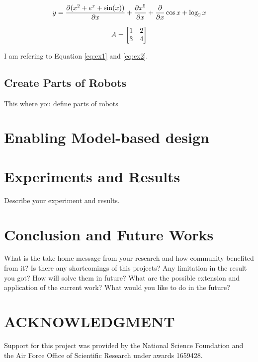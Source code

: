 \documentclass[letterpaper, 10 pt, conference]{ieeeconf}  %
\begin{document}

\begin{equation}
\label{eq:ex1}
	\begin{split}
	y = \pdv{(x^2 + e^x + \sin(x))}{x} + \pdv{x^5}{x} + \pdv{}{x}\cos x  + \log_2 x 
	\end{split}
\end{equation}

\begin{equation}
\label{eq:ex2}
A = \begin{bmatrix}1 & 2 \\ 3 & 4\end{bmatrix}
\end{equation}

I am refering to Equation \eqref{eq:ex1} and \eqref{eq:ex2}.




\subsection{Create Parts of Robots}
\label{sec:parts}
This where you define parts of robots

\section{Enabling Model-based design}
\label{sec:enablebd}



\section{Experiments and Results}
\label{sec:experiments}

Describe your experiment and results.

    
   
\section{Conclusion and Future Works}
\label{sec:conclusion}
What is the take home message from your research and how community benefited from it? Is there any shortcomings of this projects? Any limitation in the result you got? 
How will solve them in future? What are the possible extension and application of the current work? What would you like to do in the future?


\section*{ACKNOWLEDGMENT}
Support for this project was provided by the National Science Foundation and the Air Force Office of Scientific Research under awards 1659428.



\end{document}
